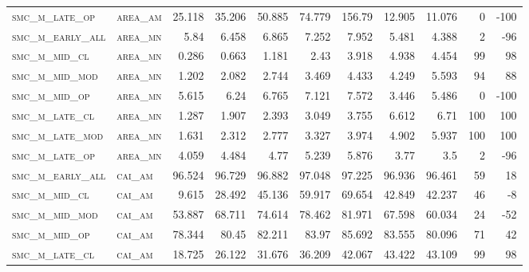 \begin{landscape}
\begin{center}
\begin{footnotesize}
\begin{longtable}{llrrrrrr|rrr}
\textsc{smc\_m\_late\_op  } & \textsc{area\_am  }   & 25.118   & 35.206   & 50.885   & 74.779   & 156.79   & 12.905      & 11.076        & 0             & -100     \\
\textsc{smc\_m\_early\_all} & \textsc{area\_mn  }   & 5.84     & 6.458    & 6.865    & 7.252    & 7.952    & 5.481       & 4.388         & 2             & -96      \\
\textsc{smc\_m\_mid\_cl   } & \textsc{area\_mn  }   & 0.286    & 0.663    & 1.181    & 2.43     & 3.918    & 4.938       & 4.454         & 99            & 98       \\
\textsc{smc\_m\_mid\_mod  } & \textsc{area\_mn  }   & 1.202    & 2.082    & 2.744    & 3.469    & 4.433    & 4.249       & 5.593         & 94            & 88       \\
\textsc{smc\_m\_mid\_op   } & \textsc{area\_mn  }   & 5.615    & 6.24     & 6.765    & 7.121    & 7.572    & 3.446       & 5.486         & 0             & -100     \\
\textsc{smc\_m\_late\_cl  } & \textsc{area\_mn  }   & 1.287    & 1.907    & 2.393    & 3.049    & 3.755    & 6.612       & 6.71          & 100           & 100      \\
\textsc{smc\_m\_late\_mod } & \textsc{area\_mn  }   & 1.631    & 2.312    & 2.777    & 3.327    & 3.974    & 4.902       & 5.937         & 100           & 100      \\
\textsc{smc\_m\_late\_op  } & \textsc{area\_mn  }   & 4.059    & 4.484    & 4.77     & 5.239    & 5.876    & 3.77        & 3.5           & 2             & -96      \\
\textsc{smc\_m\_early\_all} & \textsc{cai\_am   }   & 96.524   & 96.729   & 96.882   & 97.048   & 97.225   & 96.936      & 96.461        & 59            & 18       \\
\textsc{smc\_m\_mid\_cl   } & \textsc{cai\_am   }   & 9.615    & 28.492   & 45.136   & 59.917   & 69.654   & 42.849      & 42.237        & 46            & -8       \\
\textsc{smc\_m\_mid\_mod  } & \textsc{cai\_am   }   & 53.887   & 68.711   & 74.614   & 78.462   & 81.971   & 67.598      & 60.034        & 24            & -52      \\
\textsc{smc\_m\_mid\_op   } & \textsc{cai\_am   }   & 78.344   & 80.45    & 82.211   & 83.97    & 85.692   & 83.555      & 80.096        & 71            & 42       \\
\textsc{smc\_m\_late\_cl  } & \textsc{cai\_am   }   & 18.725   & 26.122   & 31.676   & 36.209   & 42.067   & 43.422      & 43.109        & 99            & 98       \\

\end{longtable}
\end{footnotesize}
\end{center}
\end{landscape}
